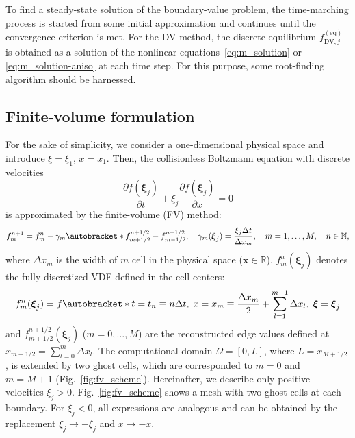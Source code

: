 \documentclass{elsarticle} %
\newcommand{\pder}[2][]{\frac{\partial#1}{\partial#2}}
\DeclarePairedDelimiter\autobracket()       %
\newcommand{\br}[1]{\autobracket*{#1}}
\newcommand{\bxi}{\boldsymbol{\xi}}
\newcommand{\bx}{\boldsymbol{x}}
\newcommand{\equil}[1]{#1^\mathrm{(eq)}}
\newcommand{\DV}{\mathrm{DV}}
\begin{document}
To find a steady-state solution of the boundary-value problem,
the time-marching process is started from some initial approximation
and continues until the convergence criterion is met.
For the DV method, the discrete equilibrium \(\equil{f}_{\DV,j}\) is obtained as a solution
of the nonlinear equations~\eqref{eq:m_solution} or \eqref{eq:m_solution-aniso} at each time step.
For this purpose, some root-finding algorithm should be harnessed.

\subsection{Finite-volume formulation}\label{sec:numerics:fv}

For the sake of simplicity, we consider a one-dimensional physical space
and introduce \(\xi = \xi_1\), \(x = x_1\).
Then, the collisionless Boltzmann equation with discrete velocities
\begin{equation}\label{eq:transport}
    \pder[f(\bxi_j)]{t} + \xi_j\pder[f(\bxi_j)]{x} = 0
\end{equation}
is approximated by the finite-volume (FV) method:
\begin{equation}\label{eq:finite_volume}
    f^{n+1}_m = f^n_m - \gamma_m\br{f^{n+1/2}_{m+1/2} - f^{n+1/2}_{m-1/2}}, \quad
    \gamma_m(\bxi_j) = \frac{\xi_j\Delta{t}}{\Delta{x_m}}, \quad
    m = 1,\dots,M, \quad n\in\mathbb{N},
\end{equation}
where \(\Delta{x_m}\) is the width of \(m\) cell in the physical space (\(\bx\in\mathbb{R}\)),
\(f^n_m(\bxi_j)\) denotes the fully discretized VDF defined in the cell centers:
\begin{equation}\label{eq:vdf_fv}
    f^n_m(\bxi_j) = f\br{
        t = t_n \equiv n\Delta{t}, \;
        x = x_m \equiv \frac{\Delta{x_m}}2 + \sum_{l=1}^{m-1}\Delta{x_l}, \;
        \bxi = \bxi_j
    }
\end{equation}
and \(f^{n+1/2}_{m+1/2}(\bxi_j)\) (\(m = 0,\dots,M\)) are the reconstructed edge values
defined at \(x_{m+1/2} = \sum_{l=0}^m\Delta{x_l}\).
The computational domain \(\Omega = [0,L]\), where \(L = x_{M+1/2}\), is extended by two ghost cells,
which are corresponded to \(m=0\) and \(m=M+1\) (Fig.~\ref{fig:fv_scheme}).
Hereinafter, we describe only positive velocities \(\xi_j>0\).
Fig.~\ref{fig:fv_scheme} shows a mesh with two ghost cells at each boundary.
For \(\xi_j<0\), all expressions are analogous
and can be obtained by the replacement \(\xi_j\to-\xi_j\) and \(x\to-x\).
\end{document}
